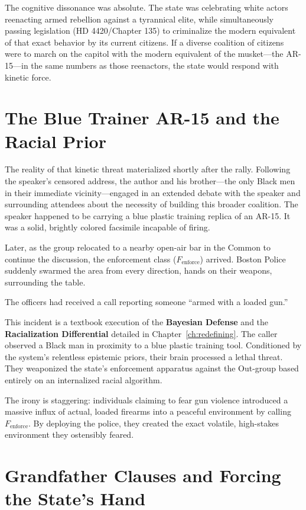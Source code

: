 The cognitive dissonance was absolute. The state was celebrating white actors reenacting armed rebellion against a tyrannical elite, while simultaneously passing legislation (HD 4420/Chapter 135) to criminalize the modern equivalent of that exact behavior by its current citizens. If a diverse coalition of citizens were to march on the capitol with the modern equivalent of the musket---the AR-15---in the same numbers as those reenactors, the state would respond with kinetic force.

\section{The Blue Trainer AR-15 and the Racial Prior}

The reality of that kinetic threat materialized shortly after the rally. Following the speaker's censored address, the author and his brother---the only Black men in their immediate vicinity---engaged in an extended debate with the speaker and surrounding attendees about the necessity of building this broader coalition. The speaker happened to be carrying a blue plastic training replica of an AR-15. It was a solid, brightly colored facsimile incapable of firing.

Later, as the group relocated to a nearby open-air bar in the Common to continue the discussion, the enforcement class ($F_{\text{enforce}}$) arrived. Boston Police suddenly swarmed the area from every direction, hands on their weapons, surrounding the table. 

The officers had received a call reporting someone ``armed with a loaded gun.'' 

This incident is a textbook execution of the \textbf{Bayesian Defense} and the \textbf{Racialization Differential} detailed in Chapter~\ref{ch:redefining}. The caller observed a Black man in proximity to a blue plastic training tool. Conditioned by the system's relentless epistemic priors, their brain processed a lethal threat. They weaponized the state's enforcement apparatus against the Out-group based entirely on an internalized racial algorithm. 

The irony is staggering: individuals claiming to fear gun violence introduced a massive influx of actual, loaded firearms into a peaceful environment by calling $F_{\text{enforce}}$. By deploying the police, they created the exact volatile, high-stakes environment they ostensibly feared.

\section{Grandfather Clauses and Forcing the State's Hand}


